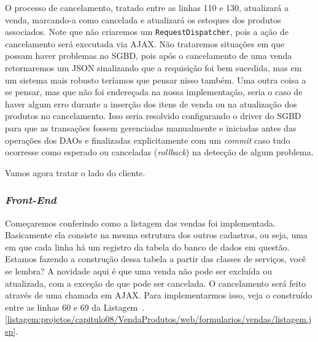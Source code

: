O processo de cancelamento, tratado entre as linhas 110 e 130, atualizará a venda, marcando-a como cancelada e atualizará os estoques dos produtos associados. Note que não criaremos um \texttt{RequestDispatcher}, pois a ação de cancelamento será executada via AJAX. Não trataremos situações em que possam haver problemas no SGBD, pois após o cancelamento de uma venda retornaremos um JSON sinalizando que a requisição foi bem sucedida, mas em um sistema mais robusto teríamos que pensar nisso também. Uma outra coisa a se pensar, mas que não foi endereçada na nossa implementação, seria o caso de haver algum erro durante a inserção dos itens de venda ou na atualização dos produtos no cancelamento. Isso seria resolvido configurando o driver do SGBD para que as transações fossem gerenciadas manualmente e iniciadas antes das operações dos DAOs e finalizadas explicitamente com um \textit{commit} caso tudo ocorresse como esperado ou canceladas (\textit{rollback}) na detecção de algum problema.

Vamos agora tratar o lado do cliente.


\subsubsection{\textit{Front-End}}

Começaremos conferindo como a listagem das vendas foi implementada. Basicamente ela consiste na mesma estrutura dos outros cadastros, ou seja, uma  em que cada linha há um registro da tabela do banco de dados em questão. Estamos fazendo a construção dessa tabela a partir das classes de serviços, você se lembra? A novidade aqui é que uma venda não pode ser excluída ou atualizada, com a exceção de que pode ser cancelada. O cancelamento será feito através de uma chamada em AJAX. Para implementarmos isso, veja o  construído entre as linhas 60 e 69 da Listagem~\thechapter.\ref{listagem:projetos/capitulo08/VendaProdutos/web/formularios/vendas/listagem.jsp}.


